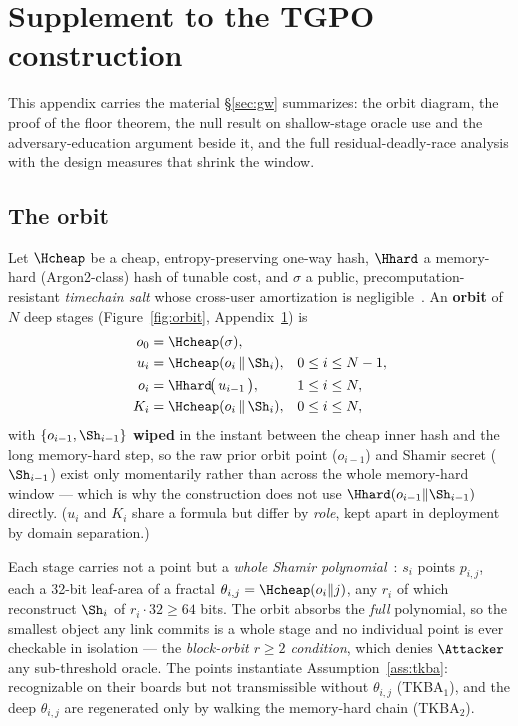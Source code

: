 \section{Supplement to the TGPO construction}
\label{app:tgpo}

\noindent This appendix carries the material \S\ref{sec:gw} summarizes: the orbit
diagram, the proof of the floor theorem, the null result on shallow-stage oracle
use and the adversary-education argument beside it, and the full
residual-deadly-race analysis with the design measures that shrink the window.

\subsection{The orbit}
\label{app:tgpo-orbit}

Let $\Hcheap$ be a cheap, entropy-preserving one-way hash, $\Hhard$ a memory-hard
(Argon2-class) hash of tunable cost, and $\sigma$ a public,
precomputation-resistant \emph{timechain salt} whose cross-user amortization is
negligible~\cite{gw-timechain-salt}. An \textbf{orbit} of $N$ deep stages
(Figure~\ref{fig:orbit}, Appendix~\ref{app:tgpo}) is
\begin{align}
  o_0 &= \Hcheap(\sigma),                && \\
  u_i &= \Hcheap(o_{i} \,\|\, \Sh_{i}),  && 0 \le i \le N-1, \\
  o_i &= \Hhard\!\big(\, u_{i-1} \,\big), && 1 \le i \le N, \\
  K_i &= \Hcheap(o_i \,\|\, \Sh_i),      && 0 \le i \le N,
  \label{eq:orbit}
\end{align}
with $\{o_{i-1}, \Sh_{i-1}\}$ \textbf{wiped} in the instant between the cheap
inner hash and the long memory-hard step, so the raw prior orbit point
($o_{i-1}$) and Shamir secret ($\Sh_{i-1}$) exist only momentarily rather than
across the whole memory-hard window ---
which is why the construction does not use $\Hhard(o_{i-1}\|\Sh_{i-1})$ directly.
($u_i$ and $K_i$ share a formula but differ by \emph{role}, kept apart in
deployment by domain separation.)

Each stage carries not a point but a \emph{whole Shamir
polynomial}~\cite{shamir1979}: $s_i$ points $p_{i,j}$, each a 32-bit leaf-area of
a fractal $\theta_{i,j} = \Hcheap(o_i \| j)$, any $r_i$ of which reconstruct
$\Sh_i$ of $r_i \cdot 32 \ge 64$ bits. The orbit absorbs the \emph{full}
polynomial, so the smallest object any link commits is a whole stage and no
individual point is ever checkable in isolation --- the \emph{block-orbit
$r \ge 2$ condition}, which denies $\Attacker$ any sub-threshold oracle. The
points instantiate Assumption~\ref{ass:tkba}: recognizable on their boards but not
transmissible without $\theta_{i,j}$ (TKBA$_1$), and the deep $\theta_{i,j}$ are
regenerated only by walking the memory-hard chain (TKBA$_2$).

